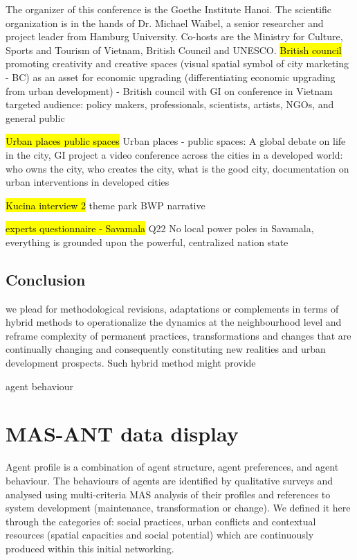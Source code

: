 \documentclass[11pt]{report}
\begin{document}
The organizer of this conference is the Goethe Institute Hanoi. The scientific organization is in the hands of Dr. Michael Waibel, a senior researcher and project leader from Hamburg University. Co-hosts are the Ministry for Culture, Sports and Tourism of Vietnam, British Council and UNESCO.
\hl{British council}
promoting creativity and creative spaces (visual spatial symbol of city marketing - BC) as an asset for economic upgrading (differentiating economic upgrading from urban development) - British council with GI on conference in Vietnam
targeted audience: policy makers, professionals, scientists, artists, NGOs, and general public

\hl{Urban places public spaces}
Urban places - public spaces: A global debate on life in the city, GI project a video conference across the cities in a developed world: who owns the city, who creates the city, what is the good city, documentation on urban interventions in developed cities

\hl{Kucina interview 2}
theme park BWP narrative

\hl{experts questionnaire - Savamala}
Q22
No local power poles in Savamala, everything is grounded upon the powerful, centralized nation state

\section{Conclusion}

we plead for methodological revisions, adaptations or complements in terms of hybrid methods to operationalize the dynamics at the neighbourhood level and reframe complexity of permanent practices, transformations and changes that are continually changing and consequently constituting new realities and urban development prospects. Such hybrid method might provide

agent behaviour

\chapter{MAS-ANT data display}

Agent profile is a combination of agent structure, agent preferences, and agent behaviour. The behaviours of agents are identified by qualitative surveys and analysed using multi-criteria MAS analysis of their profiles and references to system development (maintenance, transformation or change). We defined it here through the categories of: social practices, urban conflicts and contextual resources (spatial capacities and social potential) which are continuously produced within this initial networking.
\end{document}
